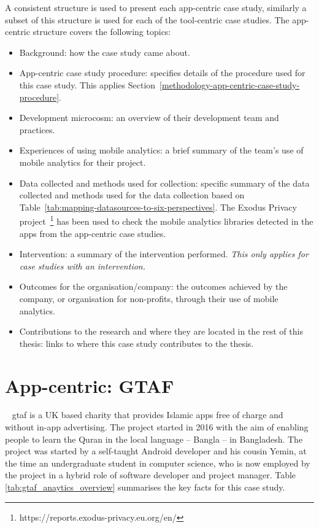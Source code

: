 A consistent structure is used to present each app-centric case study, similarly a subset of this structure is used for each of the tool-centric case studies. 
The app-centric structure covers the following topics:
\begin{itemize}
    \itemsep0em
    \item Background: how the case study came about.
    \item App-centric case study procedure: specifies details of the procedure used for this case study. This applies Section~\ref{methodology-app-centric-case-study-procedure}.
    \item Development microcosm: an overview of their development team and practices.
    \item Experiences of using mobile analytics: a brief summary of the team's use of mobile analytics for their project.
    \item Data collected and methods used for collection: specific summary of the data collected and methods used for the data collection based on Table~\ref{tab:mapping-datasources-to-six-perspectives}. The Exodus Privacy project~\footnote{https://reports.exodus-privacy.eu.org/en/} has been used to check the mobile analytics libraries detected in the apps from the app-centric case studies. 
    \item Intervention: a summary of the intervention performed. \textit{This only applies for case studies with an intervention.}
    \item Outcomes for the organisation/company: the outcomes achieved by the company, or organisation for non-profits, through their use of mobile analytics.
    \item Contributions to the research and where they are located in the rest of this thesis: links to where this case study contributes to the thesis.
\end{itemize}

\clearpage





\section{App-centric: GTAF}~\label{case-study-overview-gtaf}
\Acrfull{gtaf} is a UK based charity that provides Islamic apps free of charge and without in-app advertising. The project started in 2016 with the aim of enabling people to learn the Quran in the local language -- Bangla -- in Bangladesh. The project was started by a self-taught Android developer and his cousin Yemin, at the time an undergraduate student in computer science, who is now employed by the project in a hybrid role of software developer and project manager. Table \ref{tab:gtaf_anaytics_overview} summarises the key facts for this case study.

